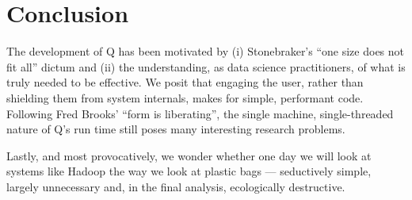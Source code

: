 \section{Conclusion}
\label{end}

The development of Q has been motivated by (i) 
Stonebraker's ``one size does not fit all'' dictum and (ii) the
understanding, as data science practitioners, of what is truly needed to be
effective. We posit that engaging the user, rather than shielding them from
system internals, makes for simple, performant code. 
Following Fred Brooks' ``form is liberating'', the single machine,
single-threaded nature of Q's run time still poses many interesting research
problems. 

Lastly, and most provocatively, we wonder whether one day we will look at
systems like Hadoop the way we look at plastic bags --- seductively simple,
largely unnecessary and, in the final analysis, ecologically destructive.

